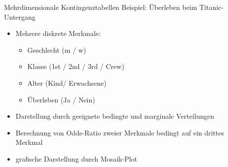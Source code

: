 \documentclass[
  10pt,
  ignorenonframetext,
]{beamer}
\providecommand{\tightlist}{%
  \setlength{\itemsep}{0pt}\setlength{\parskip}{0pt}}
\begin{document}
\begin{frame}{Mehrdimensionale Kontingenztabellen}
\protect\hypertarget{mehrdimensionale-kontingenztabellen}{}
Beispiel: Überleben beim Titanic-Untergang

\begin{itemize}
\tightlist
\item
  Mehrere diskrete Merkmale:

  \begin{itemize}
  \tightlist
  \item
    Geschlecht (m / w)
  \item
    Klasse (1st / 2nd / 3rd / Crew)
  \item
    Alter (Kind/ Erwachsene)
  \item
    Überleben (Ja / Nein)
  \end{itemize}
\item
  Darstellung durch geeignete bedingte und marginale Verteilungen
\item
  Berechnung von Odds-Ratio zweier Merkmale bedingt auf ein drittes
  Merkmal
\item
  grafische Darstellung durch Mosaik-Plot
\end{itemize}
\end{frame}
\end{document}
